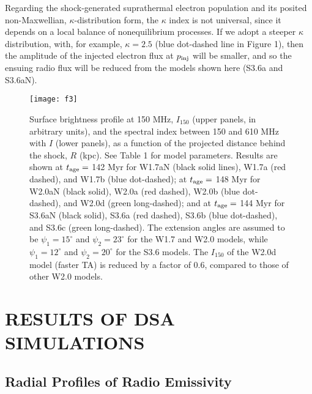 \documentclass[twocolumn]{aastex61}
\begin{document}
Regarding the shock-generated suprathermal electron population and its posited non-Maxwellian, 
$\kappa$-distribution form, the $\kappa$ index is not universal, since it depends on a local balance of 
nonequilibrium processes. If we adopt a steeper $\kappa$ distribution, with,
for example, $\kappa=2.5$ (blue dot-dashed line in Figure 1), 
then the amplitude of the injected electron flux at $p_{\rm inj}$ will be smaller, and
so the ensuing radio flux will be reduced from the models shown here (S3.6a and S3.6aN).


\begin{figure*}[t]
\vspace{-0.9cm}
\hspace{-0.2cm}
\texttt{[image: f3]}
\vspace{-6.0cm}
\caption{Surface brightness profile at 150 MHz, $I_{150}$ (upper panels, in arbitrary units),
and the spectral index between 150 and 610 MHz with $I$ (lower panels),
as a function of the projected distance behind the shock, $R$ (kpc).
See Table 1 for model parameters.
Results are shown at $t_{\rm age}=$ 142 Myr for W1.7aN (black solid lines), W1.7a (red dashed), and W1.7b (blue dot-dashed);
at $t_{\rm age}=$ 148 Myr for W2.0aN (black solid), W2.0a (red dashed), W2.0b (blue dot-dashed), and W2.0d (green long-dashed);
and at $t_{\rm age}=$ 144 Myr for S3.6aN (black solid), S3.6a (red dashed), S3.6b (blue dot-dashed), and S3.6c (green long-dashed).
The extension angles are assumed to be $\psi_1=15^{\circ}$ and $\psi_2=23^{\circ}$ for the W1.7 and W2.0 models,
while $\psi_1=12^{\circ}$ and $\psi_2=20^{\circ}$ for the S3.6 models.
The $I_{150}$ of the W2.0d model (faster TA) is reduced by a factor of 0.6,
compared to those of other W2.0 models.
}
\label{Fig3}
\end{figure*}

\section{RESULTS OF DSA SIMULATIONS}

\subsection{Radial Profiles of Radio Emissivity}
\end{document}
